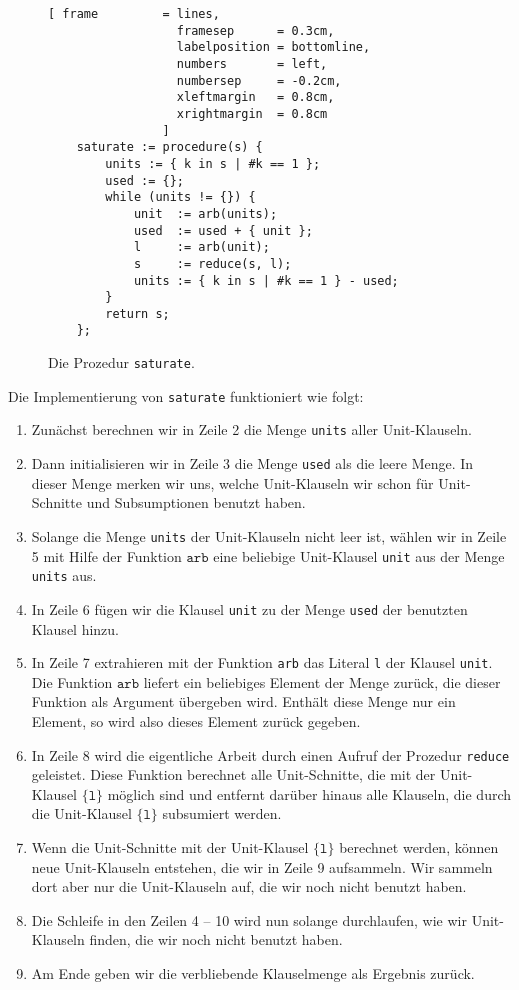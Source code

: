 \begin{figure}[!ht]
  \centering
\begin{Verbatim}[ frame         = lines, 
                  framesep      = 0.3cm, 
                  labelposition = bottomline,
                  numbers       = left,
                  numbersep     = -0.2cm,
                  xleftmargin   = 0.8cm,
                  xrightmargin  = 0.8cm
                ]
    saturate := procedure(s) {
        units := { k in s | #k == 1 };
        used := {};
        while (units != {}) {
            unit  := arb(units);
            used  := used + { unit };
            l     := arb(unit);
            s     := reduce(s, l);
            units := { k in s | #k == 1 } - used;        
        }
        return s;
    };
\end{Verbatim}
\vspace*{-0.3cm}
  \caption{Die Prozedur \texttt{saturate}.}
  \label{fig:saturate}
\end{figure} 
Die Implementierung von \texttt{saturate} funktioniert wie folgt: 
\begin{enumerate}
\item Zun\"{a}chst berechnen wir in Zeile 2 die Menge \texttt{units} aller Unit-Klauseln.  
\item Dann initialisieren wir in Zeile 3 die Menge \texttt{used} als die leere Menge.
      In dieser Menge merken wir uns, welche Unit-Klauseln wir schon f\"{u}r Unit-Schnitte und
      Subsumptionen benutzt haben.
\item Solange die Menge \texttt{units} der Unit-Klauseln nicht leer ist, w\"{a}hlen wir in Zeile 5
      mit Hilfe der Funktion $\texttt{arb}$ eine beliebige Unit-Klausel \texttt{unit} aus der Menge
      \texttt{units} aus. 
\item In Zeile 6 f\"{u}gen wir die Klausel \texttt{unit} zu der Menge
      \texttt{used} der benutzten Klausel hinzu.  
\item In Zeile 7 extrahieren mit der Funktion \texttt{arb} das Literal \texttt{l} der Klausel
      \texttt{unit}.  Die Funktion $\texttt{arb}$ liefert ein beliebiges Element der Menge zur\"{u}ck,
      die dieser Funktion als Argument \"{u}bergeben wird.  Enth\"{a}lt diese Menge nur ein Element, so
      wird also dieses Element zur\"{u}ck gegeben.
\item In Zeile 8 wird  die eigentliche Arbeit durch einen Aufruf der Prozedur
      \texttt{reduce} geleistet.  Diese Funktion berechnet alle Unit-Schnitte, die mit der
      Unit-Klausel $\{\texttt{l}\}$ m\"{o}glich sind und entfernt dar\"{u}ber hinaus alle Klauseln, die
      durch die Unit-Klausel $\{\texttt{l}\}$ subsumiert werden.
\item Wenn die Unit-Schnitte mit der Unit-Klausel $\{\texttt{l}\}$ berechnet werden, k\"{o}nnen neue
      Unit-Klauseln entstehen, die wir in Zeile 9 aufsammeln.  Wir sammeln dort aber nur die Unit-Klauseln auf,
       die wir noch nicht benutzt haben. 
\item Die Schleife in den Zeilen 4 -- 10 wird nun solange durchlaufen, wie wir 
      Unit-Klauseln finden, die wir noch nicht benutzt haben.
\item Am Ende geben wir die verbliebende Klauselmenge als Ergebnis zur\"{u}ck.
\end{enumerate}

